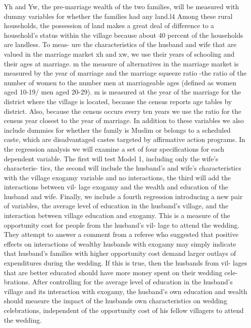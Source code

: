 \documentclass[a4paper, 11pt, onecolumn]{article}
\begin{document}
Yh and Yw, the pre-marriage wealth of the two families, will be measured with
dummy variables for whether the families had any land.l4 Among these rural households, the possession of land makes a great deal of difference to a household's status
within the village because about 40 percent of the households are landless. To meas-
ure the characteristics of the husband and wife that are valued in the marriage market
xh and xw, we use their years of schooling and their ages at marriage. m the measure
of alternatives in the marriage market is measured by the year of marriage and the
marriage squeeze ratio \citep{Rao1993}-the ratio of the number of women to the number men at
marriageable ages (defined as women aged 10-19/ men aged 20-29). m is measured
at the year of the marriage for the district where the village is located, because the
census reports age tables by district. Also, because the census occurs every ten years
we use the ratio for the census year closest to the year of marriage. In addition to these
variables we also include dummies for whether the family is Muslim or belongs to
a scheduled caste, which are disadvantaged castes targeted by affirmative action
programs.
In the regression analysis we will examine a set of four specifications for each
dependent variable. The first will test Model 1, including only the wife's characteris-
tics, the second will include the husband's and wife's characteristics with the village
exogamy variable and no interactions, the third will add the interactions between vil-
lage exogamy and the wealth and education of the husband and wife. Finally, we
include a fourth regression introducing a new pair of variables, the average level of
education in the husband's village, and the interaction between village education and
exogamy. This is a measure of the opportunity cost for people from the husband's vil-
lage to attend the wedding. They attempt to answer a comment from a referee who
suggested that positive effects on interactions of wealthy husbands with exogamy may
simply indicate that husband's families with higher opportunity cost demand larger
outlays of expenditures during the wedding. If this is true, then the husbands from vil-
lages that are better educated should have more money spent on their wedding cele-
brations. After controlling for the average level of education in the husband's village
and its interaction with exogamy, the husband's own education and wealth should
measure the impact of the husbands own characteristics on wedding celebrations,
independent of the opportunity cost of his fellow villagers to attend the wedding.
\end{document}
